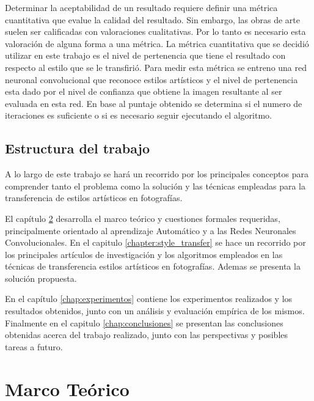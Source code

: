 \documentclass[a4paper,11pt,spanish]{book}
\begin{document}
    Determinar la aceptabilidad de un resultado requiere definir una métrica cuantitativa que evalue la calidad del resultado. 
    Sin embargo, las obras de arte suelen ser calificadas con valoraciones cualitativas. Por lo tanto es necesario esta valoración de alguna forma a una métrica. 
    La métrica cuantitativa que se decidió utilizar en este trabajo es el nivel de pertenencia que tiene el resultado con respecto al estilo que se le transfirió.
    Para medir esta métrica se entreno una red neuronal convolucional que reconoce estilos artísticos y el nivel de pertenencia esta dado por el nivel de confianza que 
    obtiene la imagen resultante al ser evaluada en esta red. 
    En base al puntaje obtenido se determina si el numero de iteraciones es suficiente o si es necesario seguir ejecutando el algoritmo.


  \section {Estructura del trabajo}
    A lo largo de este trabajo se hará un recorrido por los principales conceptos para comprender tanto el problema como la solución y las técnicas empleadas para la 
    transferencia de estilos artísticos en fotografías.

    El capítulo \ref{chap:marco_teorico} desarrolla el marco teórico y cuestiones formales requeridas, principalmente orientado al aprendizaje Automático y a las Redes Neuronales Convolucionales.
    En el capitulo \ref{chapter:style_transfer} se hace un recorrido por los principales artículos de investigación y los algoritmos empleados en las técnicas 
    de transferencia estilos artísticos en fotografías. Ademas se presenta la solución propuesta.

    En el capítulo \ref{chap:experimentos} contiene los experimentos realizados y los resultados obtenidos, junto con un análisis y evaluación empírica de los mismos. 
    Finalmente en el capitulo \ref{chap:conclusiones} se  presentan las conclusiones obtenidas acerca del trabajo realizado, junto con las perspectivas y posibles tareas a futuro.

\chapter{Marco Teórico} \label{chap:marco_teorico}
\end{document}
